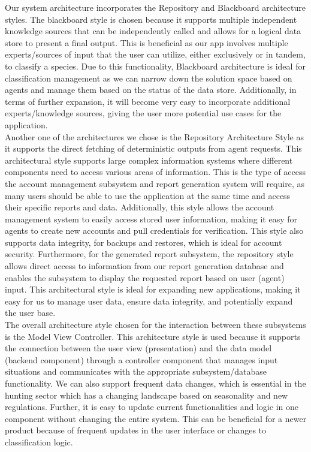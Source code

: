 \documentclass[]{article}
\begin{document}
Our system architecture incorporates the Repository and Blackboard architecture styles. The blackboard style is chosen because it supports multiple independent knowledge sources that can be independently called and allows for a logical data store to present a final output. This is beneficial as our app involves multiple experts/sources of input that the user can utilize, either exclusively or in tandem, to classify a species. Due to this functionality, Blackboard architecture is ideal for classification management as we can narrow down the solution space based on agents and manage them based on the status of the data store. Additionally, in terms of further expansion, it will become very easy to incorporate additional experts/knowledge sources, giving the user more potential use cases for the application.
\\

Another one of the architectures we chose is the Repository Architecture Style as it supports the direct fetching of deterministic outputs from agent requests. This architectural style supports large complex information systems where different components need to access various areas of information. This is the type of access the account management subsystem and report generation system will require, as many users should be able to use the application at the same time and access their specific reports and data. Additionally, this style allows the account management system to easily access stored user information, making it easy for agents to create new accounts and pull credentials for verification. This style also supports data integrity, for backups and restores, which is ideal for account security. Furthermore, for the generated report subsystem, the repository style allows direct access to information from our report generation database and enables the subsystem to display the requested report based on user (agent) input. This architectural style is ideal for expanding new applications, making it easy for us to manage user data, ensure data integrity, and potentially expand the user base.
\\

The overall architecture style chosen for the interaction between these subsystems is the Model View Controller. This architecture style is used because it supports the connection between the user view (presentation) and the data model (backend component) through a controller component that manages input situations and communicates with the appropriate subsystem/database functionality. We can also support frequent data changes, which is essential in the hunting sector which has a changing landscape based on seasonality and new regulations. Further, it is easy to update current functionalities and logic in one component without changing the entire system. This can be beneficial for a newer product because of frequent updates in the user interface or changes to classification logic.  
\\
\end{document}
